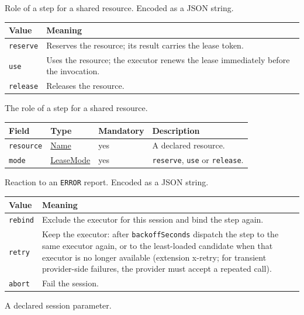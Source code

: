\documentclass[a4paper]{arrowhead}
\newcommand{\mref}[1]{{\textcolor{ArrowheadPurple}{\hyperref[sec:model:#1]{#1}}}}
\newcommand{\pref}[1]{{\textcolor{ArrowheadGrey}{\hyperref[sec:model:primitives:#1]{#1}}}}
\begin{document}
Role of a step for a shared resource.
 Encoded as a JSON string.
{\small
\begin{longtable}{|p{3.9cm}|p{11.9cm}|}

\hline
\rowcolor{gray!33} Value & Meaning \\ \hline
\endhead
\texttt{reserve} & Reserves the resource; its result carries the lease token. \\ \hline
\texttt{use} & Uses the resource; the executor renews the lease immediately before the invocation. \\ \hline
\texttt{release} & Releases the resource. \\ \hline
\end{longtable}
}

The role of a step for a shared resource.

{\small
\begin{longtable}{|p{3.7cm}|p{4.2cm}|p{1.6cm}|p{6.3cm}|}

\hline
\rowcolor{gray!33} Field & Type & Mandatory & Description \\ \hline
\endhead
\texttt{resource} & \pref{Name} & yes & A declared resource. \\ \hline
\texttt{mode} & \mref{LeaseMode} & yes & \texttt{reserve}, \texttt{use} or \texttt{release}. \\ \hline
\end{longtable}
}

Reaction to an \texttt{ERROR} report.
 Encoded as a JSON string.
{\small
\begin{longtable}{|p{3.9cm}|p{11.9cm}|}

\hline
\rowcolor{gray!33} Value & Meaning \\ \hline
\endhead
\texttt{rebind} & Exclude the executor for this session and bind the step again. \\ \hline
\texttt{retry} & Keep the executor: after \texttt{backoff\allowbreak{}Seconds} dispatch the step to the same executor again, or to the least-loaded candidate when that executor is no longer available (extension x-retry; for transient provider-side failures, the provider must accept a repeated call). \\ \hline
\texttt{abort} & Fail the session. \\ \hline
\end{longtable}
}

A declared session parameter.
\end{document}
